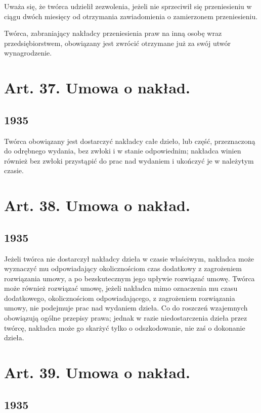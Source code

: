 \documentclass[withmarginpar]{book}
\begin{document}
Uważa się, że twórca udzielił zezwolenia, jeżeli nie sprzeciwił się
przeniesieniu w ciągu dwóch miesięcy od otrzymania zawiadomienia o
zamierzonem przeniesieniu.

Twórca, zabraniający nakładcy przeniesienia praw na inną osobę wraz
przedsiębiorstwem, obowiązany jest zwrócić otrzymane już za swój utwór
wynagrodzenie.

\section{Art. 37. Umowa o nakład.}
\label{sec:art.-37}
\subsection{1935}
\label{sec:art.-37-1}

Twórca obowiązany jest dostarczyć nakładcy całe dzieło, lub część,
przeznaczoną do odrębnego wydania, bez zwłoki i w stanie odpowiednim;
nakładca winien również bez zwłoki przystąpić do prac nad wydaniem i
ukończyć je w należytym czasie.

\section{Art. 38. Umowa o nakład.}
\label{sec:art.-38}
\subsection{1935}
\label{sec:art.-38-1}

Jeżeli twórca nie dostarczył nakładcy dzieła w czasie właściwym,
nakładca może wyznaczyć mu odpowiadający okolicznościom czas dodatkowy
z zagrożeniem rozwiązania umowy, a po bezskutecznym jego upływie
rozwiązać umowę. Twórca może również rozwiązać umowę, jeżeli nakładca
mimo oznaczenia mu czasu dodatkowego, okolicznościom odpowiadającego,
z zagrożeniem rozwiązania umowy, nie podejmuje prac nad wydaniem
dzieła. Co do roszczeń wzajemnych obowiązują ogólne przepisy prawa;
jednak w razie niedostarczenia dzieła przez twórcę, nakładca może go
skarżyć tylko o odszkodowanie, nie zaś o dokonanie dzieła.

\section{Art. 39. Umowa o nakład.}
\label{sec:art.-39}
\subsection{1935}
\label{sec:art.-39-1}
\end{document}
